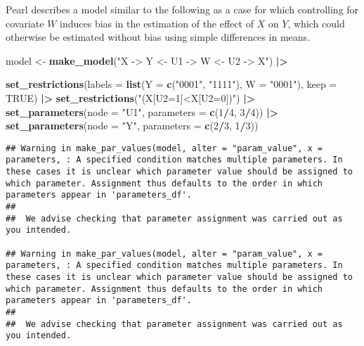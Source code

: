 \documentclass[
  12pt,
]{book}
\newenvironment{Shaded}{\begin{snugshade}}{\end{snugshade}}
\newcommand{\AttributeTok}[1]{\textcolor[rgb]{0.13,0.29,0.53}{#1}}
\newcommand{\ConstantTok}[1]{\textcolor[rgb]{0.56,0.35,0.01}{#1}}
\newcommand{\DecValTok}[1]{\textcolor[rgb]{0.00,0.00,0.81}{#1}}
\newcommand{\FunctionTok}[1]{\textcolor[rgb]{0.13,0.29,0.53}{\textbf{#1}}}
\newcommand{\NormalTok}[1]{#1}
\newcommand{\OtherTok}[1]{\textcolor[rgb]{0.56,0.35,0.01}{#1}}
\newcommand{\SpecialCharTok}[1]{\textcolor[rgb]{0.81,0.36,0.00}{\textbf{#1}}}
\newcommand{\StringTok}[1]{\textcolor[rgb]{0.31,0.60,0.02}{#1}}
\begin{document}
Pearl describes a model similar to the following as a case for which controlling for covariate \(W\) induces bias in the estimation of the effect of \(X\) on \(Y\), which could otherwise be estimated without bias using simple differences in means.

\begin{Shaded}
\begin{Highlighting}[]
\NormalTok{model }\OtherTok{\textless{}{-}} \FunctionTok{make\_model}\NormalTok{(}\StringTok{"X {-}\textgreater{} Y \textless{}{-} U1 {-}\textgreater{} W \textless{}{-} U2 {-}\textgreater{} X"}\NormalTok{) }\SpecialCharTok{|\textgreater{}}
  
  \FunctionTok{set\_restrictions}\NormalTok{(}\AttributeTok{labels =} \FunctionTok{list}\NormalTok{(}\AttributeTok{Y =} \FunctionTok{c}\NormalTok{(}\StringTok{"0001"}\NormalTok{, }\StringTok{"1111"}\NormalTok{), }\AttributeTok{W =} \StringTok{"0001"}\NormalTok{), }\AttributeTok{keep =} \ConstantTok{TRUE}\NormalTok{) }\SpecialCharTok{|\textgreater{}}
  \FunctionTok{set\_restrictions}\NormalTok{(}\StringTok{"(X[U2=1]\textless{}X[U2=0])"}\NormalTok{) }\SpecialCharTok{|\textgreater{}}
  \FunctionTok{set\_parameters}\NormalTok{(}\AttributeTok{node =} \StringTok{"U1"}\NormalTok{,  }\AttributeTok{parameters =} \FunctionTok{c}\NormalTok{(}\DecValTok{1}\SpecialCharTok{/}\DecValTok{4}\NormalTok{, }\DecValTok{3}\SpecialCharTok{/}\DecValTok{4}\NormalTok{)) }\SpecialCharTok{|\textgreater{}}
  \FunctionTok{set\_parameters}\NormalTok{(}\AttributeTok{node =} \StringTok{"Y"}\NormalTok{, }\AttributeTok{parameters =} \FunctionTok{c}\NormalTok{(}\DecValTok{2}\SpecialCharTok{/}\DecValTok{3}\NormalTok{, }\DecValTok{1}\SpecialCharTok{/}\DecValTok{3}\NormalTok{))}
\end{Highlighting}
\end{Shaded}

\begin{verbatim}
## Warning in make_par_values(model, alter = "param_value", x = parameters, : A specified condition matches multiple parameters. In these cases it is unclear which parameter value should be assigned to which parameter. Assignment thus defaults to the order in which parameters appear in 'parameters_df'.
##               
##  We advise checking that parameter assignment was carried out as you intended.

## Warning in make_par_values(model, alter = "param_value", x = parameters, : A specified condition matches multiple parameters. In these cases it is unclear which parameter value should be assigned to which parameter. Assignment thus defaults to the order in which parameters appear in 'parameters_df'.
##               
##  We advise checking that parameter assignment was carried out as you intended.
\end{verbatim}
\end{document}
